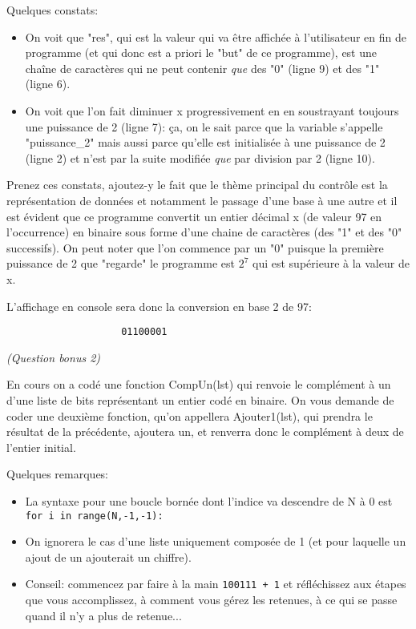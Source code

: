 \documentclass[11pt,a4paper]{exam}
\begin{document}
\begin{questions}
\begin{spacing}{1}
\begin{solution}
             	Quelques constats:
             	\begin{itemize}
             		\item On voit que "res", qui est la valeur qui va être affichée à l'utilisateur en fin de programme (et qui donc est a priori le "but" de ce programme), est une chaîne de caractères qui ne peut contenir \textit{que} des "0" (ligne 9) et des "1" (ligne 6).
             		\item On voit que l'on fait diminuer x progressivement en en soustrayant toujours une puissance de 2 (ligne 7): ça, on le sait parce que la variable s'appelle "puissance\_2" mais aussi parce qu'elle est initialisée à une puissance de 2 (ligne 2) et n'est par la suite modifiée \textit{que} par division par 2 (ligne 10).
             	\end{itemize}
             	
             	Prenez ces constats, ajoutez-y le fait que le thème principal du contrôle est la représentation de données et notamment le passage d'une base à une autre et il est évident que ce programme convertit un entier décimal x (de valeur 97 en l'occurrence) en binaire sous forme d'une chaine de caractères (des "1" et des "0" successifs). On peut noter que l'on commence par un "0" puisque la première puissance de 2 que "regarde" le programme est $2^7$ qui est supérieure à la valeur de x.
             	
             	L'affichage en console sera donc la conversion en base 2 de 97:
             	\begin{verbatim}
             		01100001
             	\end{verbatim}
             	
            \end{solution} 
            
            \textit{(Question bonus 2)}
            
            En cours on a codé une fonction CompUn(lst) qui renvoie le complément à un d'une liste de bits représentant un entier codé en binaire. On vous demande de coder une deuxième fonction, qu'on appellera Ajouter1(lst), qui prendra le résultat de la précédente, ajoutera un, et renverra donc le complément à deux de l'entier initial.
            
            Quelques remarques:
            \begin{itemize}
            	\item La syntaxe pour une boucle bornée dont l'indice va descendre de N à 0 est \texttt{for i in range(N,-1,-1):}
            	\item On ignorera le cas d'une liste uniquement composée de 1 (et pour laquelle un ajout de un ajouterait un chiffre).
            	\item Conseil: commencez par faire à la main \texttt{100111 + 1} et réfléchissez aux étapes que vous accomplissez, à comment vous gérez les retenues, à ce qui se passe quand il n'y a plus de retenue...
            \end{itemize}
            

\end{spacing}
\end{questions}
\end{document}
